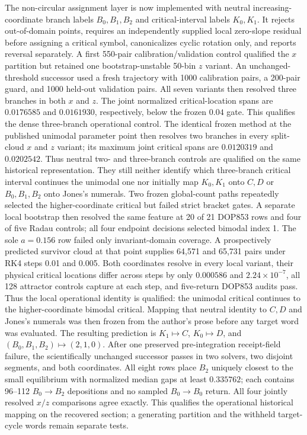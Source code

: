 The non-circular assignment layer is now implemented with neutral increasing-
coordinate branch labels $B_0,B_1,B_2$ and critical-interval labels $K_0,K_1$.
It rejects out-of-domain points, requires an independently supplied local
zero-slope residual before assigning a critical symbol, canonicalizes cyclic
rotation only, and reports reversal separately.  A first 550-pair
calibration/validation control qualified the $x$ partition but retained one
bootstrap-unstable 50-bin $z$ variant.  An unchanged-threshold successor used
a fresh trajectory with 1000 calibration pairs, a 200-pair guard, and 1000
held-out validation pairs.  All seven variants then resolved three branches
in both $x$ and $z$.  The joint normalized critical-location spans are
$0.0176585$ and $0.0161930$, respectively, below the frozen $0.04$ gate.  This
qualifies the dense three-branch operational control.  The identical frozen
method at the published unimodal parameter point then resolves two branches in
every split-cloud $x$ and $z$ variant; its maximum joint critical spans are
$0.0120319$ and $0.0202542$.  Thus neutral two- and three-branch controls are
qualified on the same historical representation.  They still neither identify
which three-branch critical interval continues the unimodal one nor initially
map $K_0,K_1$ onto $C,D$ or $B_0,B_1,B_2$ onto Jones's numerals.  Two frozen
global-count paths repeatedly selected the higher-coordinate critical but
failed strict bracket gates.  A separate local bootstrap then resolved the
same feature at 20 of 21 DOP853 rows and four of five Radau controls; all four
endpoint decisions selected bimodal index 1.  The sole $a=0.156$ row failed
only invariant-domain coverage.  A prospectively predicted survivor cloud at
that point supplies 64,571 and 65,731 pairs under RK4 steps 0.01 and 0.005.
Both coordinates resolve in every local variant, their physical critical
locations differ across steps by only $0.000586$ and $2.24\times10^{-7}$, all
128 attractor controls capture at each step, and five-return DOP853 audits pass.
Thus the local operational identity is qualified: the unimodal critical
continues to the higher-coordinate bimodal critical.  Mapping that neutral
identity to $C,D$ and Jones's numerals was then frozen from the author's prose
before any target word was evaluated.  The resulting prediction is
$K_1\mapsto C$, $K_0\mapsto D$, and
$(B_0,B_1,B_2)\mapsto(2,1,0)$.  After one preserved pre-integration
receipt-field failure, the scientifically unchanged successor passes in two
solvers, two disjoint segments, and both coordinates.  All eight rows place
$B_2$ uniquely closest to the small equilibrium with normalized median gaps
at least $0.335762$; each contains 96--112 $B_0\to B_2$ depositions and no
sampled $B_0\to B_0$ return.  All four jointly resolved $x/z$ comparisons
agree exactly.  This qualifies the operational historical mapping on the
recovered section; a generating partition and the withheld target-cycle words
remain separate tests.

